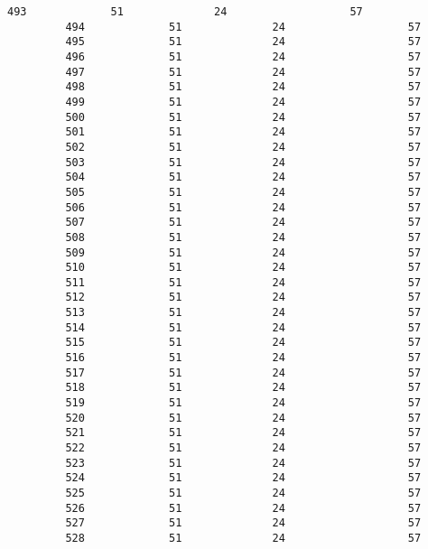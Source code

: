 \documentclass{article}
\begin{document}
\begin{Verbatim}[commandchars=\\\{\}]
         493             51              24                   57   
         494             51              24                   57   
         495             51              24                   57   
         496             51              24                   57   
         497             51              24                   57   
         498             51              24                   57   
         499             51              24                   57   
         500             51              24                   57   
         501             51              24                   57   
         502             51              24                   57   
         503             51              24                   57   
         504             51              24                   57   
         505             51              24                   57   
         506             51              24                   57   
         507             51              24                   57   
         508             51              24                   57   
         509             51              24                   57   
         510             51              24                   57   
         511             51              24                   57   
         512             51              24                   57   
         513             51              24                   57   
         514             51              24                   57   
         515             51              24                   57   
         516             51              24                   57   
         517             51              24                   57   
         518             51              24                   57   
         519             51              24                   57   
         520             51              24                   57   
         521             51              24                   57   
         522             51              24                   57   
         523             51              24                   57   
         524             51              24                   57   
         525             51              24                   57   
         526             51              24                   57   
         527             51              24                   57   
         528             51              24                   57   
         

\end{Verbatim}
\end{document}
